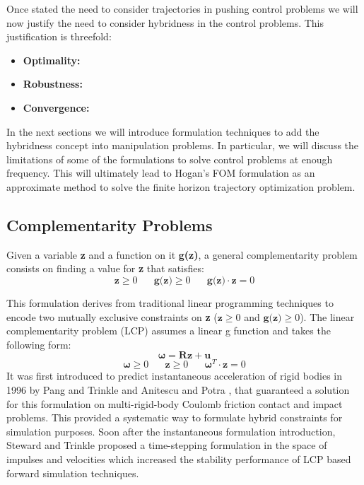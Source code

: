 \documentclass[12,twoside]{TFG-GM}
\theoremstyle{definition}
\theoremstyle{remark}
\begin{document}
Once stated the need to consider trajectories in pushing control problems we will now justify the need to consider hybridness in the control problems. This justification is threefold:

\begin{itemize}
\item {\textbf{Optimality:}}
\item {\textbf{Robustness:}}
\item {\textbf{Convergence:}}
\end{itemize}

In the next sections we will introduce formulation techniques to add the hybridness concept into manipulation problems. In particular, we will discuss the limitations of some of the formulations to solve control problems at enough frequency. This will ultimately lead to Hogan's FOM formulation as an approximate method to solve the finite horizon trajectory optimization problem.

\subsection{Complementarity Problems}
\label{subsec:comp_prob}
Given a variable \textbf{z} and a function on it \textbf{g(z)}, a general complementarity problem consists on finding a value for \textbf{z} that satisfies:
$$ \textbf{z} \geq 0 \,\,\,\,\,\,\,\,\,\, \textbf{g(z)} \geq 0 \,\,\,\,\,\,\,\,\,\, \textbf{g(z)} \cdot \textbf{z} = 0$$

This formulation derives from traditional linear programming techniques to encode two mutually exclusive constraints on \textbf{z} ($\textbf{z} \geq 0$ and $\textbf{g(z)} \geq 0$). The linear complementarity problem (LCP) \cite{compconst} assumes a linear g function and takes the following form:
$$\boldsymbol{\omega} = \textbf{R} \textbf{z} + \textbf{u} $$
$$	\boldsymbol{\omega} \geq 0 \,\,\,\,\,\,\,\,\,\, \textbf{z} \geq 0 \,\,\,\,\,\,\,\,\,\, \boldsymbol{\omega}^{T} \cdot \textbf{z} = 0$$
It was first introduced to predict instantaneous acceleration of rigid bodies in 1996 by Pang and Trinkle \cite{lcpi} and Anitescu and Potra \cite{lcc1}, that guaranteed a solution for this formulation on multi-rigid-body Coulomb friction contact and impact problems. This provided a systematic way to formulate hybrid constraints for simulation purposes. Soon after the instantaneous formulation introduction, Steward and Trinkle \cite{lcpd} proposed a time-stepping formulation in the space of impulses and velocities which increased the stability performance of LCP based forward simulation techniques.
\end{document}
